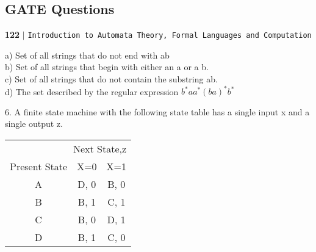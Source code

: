 \documentclass[9pt]{beamer}
\begin{document}
\begin{frame}
\section*{GATE Questions}
 \begin{flushleft}
    \textbf{122}\hspace*{0.1cm} \textbf{$|$} \hspace*{0.1cm} \texttt{Introduction to Automata Theory, Formal Languages and Computation}
  \end{flushleft}
\vspace*{0.4cm}

\vspace*{3mm}

\hspace{0.5cm}
a) Set of all strings that do not end with ab\\
\hspace{0.5cm}
b) Set of all strings that begin with either an a or a b.\\
\hspace{0.5cm}
c) Set of all strings that do not contain the substring ab.\\
\hspace{0.5cm}
d) The set described by the regular expression $b^{*}aa^{*}(ba)^{*}b^{*}$ \\

\vspace*{3mm}

\vspace*{0.2cm}
6. A finite state machine with the following state table has a single input x and a single output z.\\

\begin{center}
\begin{tabular}{ccc}
\hline

\hline

\hline

\hline
  \multicolumn{3}{r}{{Next State,z}}\\
 \cline{2-3}
{Present State} & {X=0} & {X=1}\\
\hline
A & D, 0 & B, 0\\
B & B, 1 & C, 1\\
C & B, 0 & D, 1\\
D & B, 1 & C, 0\\
\hline

\hline

\hline

\hline
\end{tabular}
\end{center}

\vspace*{0.2cm}
\end{frame}
\end{document}
